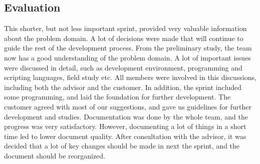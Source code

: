 \subsection{Evaluation}
This shorter, but not less important sprint, provided
very valuable information about the problem domain. A lot of decisions were made
that will continue to guide the rest of the development process. From the
preliminary study, the team now has a good understanding of the problem domain.
A lot of important issues were discussed in detail, such as development
environment, programming and scripting languages, field study etc. All members
were involved in this discussions, including both the advisor and the customer.
In addition, the sprint included some programming, and laid the foundation for
further development.  The customer agreed with most of our suggestions, and gave
us guidelines for further development and studies.  Documentation was done by
the whole team, and the progress was very satisfactory. However, documenting a
lot of things in a short time led to lower document quality. After consultation
with the advisor, it was decided that a lot of key changes should be made in
next the sprint, and the document should be reorganized.
